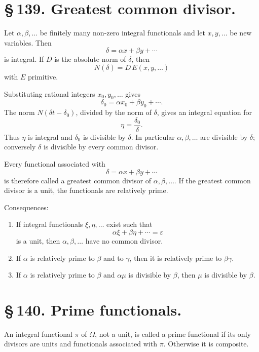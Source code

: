 \documentclass[11pt]{article}
\begin{document}
\section*{\S\,139. Greatest common divisor.}

Let \(\alpha,\beta,\ldots\) be finitely many non-zero integral
functionals and let \(x,y,\ldots\) be new variables. Then
\begin{equation}
\delta=\alpha x+\beta y+\cdots
\tag{1}
\end{equation}
is integral. If \(D\) is the absolute norm of \(\delta\), then
\begin{equation}
N(\delta)=D\,E(x,y,\ldots)
\tag{2}
\end{equation}
with \(E\) primitive.

Substituting rational integers \(x_0,y_0,\ldots\) gives
\[
\delta_0=\alpha x_0+\beta y_0+\cdots.
\]
The norm \(N(\delta t-\delta_0)\), divided by the norm of \(\delta\),
gives an integral equation for
\[
\eta=\frac{\delta_0}{\delta}.
\]
Thus \(\eta\) is integral and \(\delta_0\) is divisible by
\(\delta\). In particular \(\alpha,\beta,\ldots\) are divisible by
\(\delta\); conversely \(\delta\) is divisible by every common
divisor.

Every functional associated with
\[
\delta=\alpha x+\beta y+\cdots
\]
is therefore called a greatest common divisor of
\(\alpha,\beta,\ldots\). If the greatest common divisor is a unit, the
functionals are relatively prime.

Consequences:
\begin{enumerate}[label=\arabic*.]
\item If integral functionals \(\xi,\eta,\ldots\) exist such that
\[
\alpha\xi+\beta\eta+\cdots=\varepsilon
\]
is a unit, then \(\alpha,\beta,\ldots\) have no common divisor.

\item If \(\alpha\) is relatively prime to \(\beta\) and to \(\gamma\),
then it is relatively prime to \(\beta\gamma\).

\item If \(\alpha\) is relatively prime to \(\beta\) and
\(\alpha\mu\) is divisible by \(\beta\), then \(\mu\) is divisible by
\(\beta\).
\end{enumerate}

\section*{\S\,140. Prime functionals.}

An integral functional \(\pi\) of \(\Omega\), not a unit, is called a
prime functional if its only divisors are units and functionals
associated with \(\pi\). Otherwise it is composite.
\end{document}
